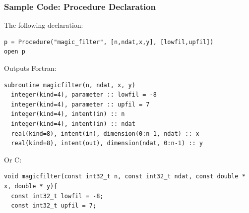\documentclass{beamer}
\begin{document}
\begin{frame}[fragile]
\frametitle{Sample Code: Procedure Declaration}
The following declaration:
\tiny
{}
\begin{lstlisting}
p = Procedure("magic_filter", [n,ndat,x,y], [lowfil,upfil])
open p
\end{lstlisting}
\normalsize 
Outputs Fortran:
\tiny
{}
\begin{lstlisting}
subroutine magicfilter(n, ndat, x, y)
  integer(kind=4), parameter :: lowfil = -8
  integer(kind=4), parameter :: upfil = 7
  integer(kind=4), intent(in) :: n
  integer(kind=4), intent(in) :: ndat
  real(kind=8), intent(in), dimension(0:n-1, ndat) :: x
  real(kind=8), intent(out), dimension(ndat, 0:n-1) :: y
\end{lstlisting}
\normalsize
Or C:
\tiny
{}
\begin{lstlisting}
void magicfilter(const int32_t n, const int32_t ndat, const double * x, double * y){
  const int32_t lowfil = -8;
  const int32_t upfil = 7;
\end{lstlisting}
\end{frame}
\end{document}
